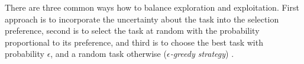 There are three common ways how to balance exploration and exploitation.
First approach is to incorporate the uncertainty about the task into the selection
preference, %
second is to select the task at random with the probability proportional to its
preference, %
and third is to choose the best task with probability $\epsilon$, and
a random task otherwise (\emph{$\epsilon$-greedy strategy})
\cite{rl}.






